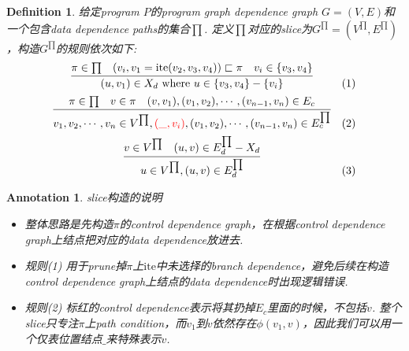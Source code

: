 \documentclass{article}
\newtheorem{definition}[theorem]{Definition}
\newtheorem{annotation}[theorem]{Annotation}
\begin{document}
\begin{definition}
\rm 给定program $P$的program graph dependence graph $G=(V,E)$和一个包含data dependence paths的集合$\prod$. 定义$\prod$对应的slice为$G^{\prod} = (V^{\prod},E^{\prod})$，构造$G^{\prod}$的规则依次如下:
$$
\begin{array}{cl}
\infer{(u,v_1) \in X_d~\text{where}~u \in \{v_3,v_4\}-\{v_i\}}{\pi \in \prod & (v_i,v_1=\text{ite}(v_2,v_3,v_4)) \sqsubset \pi & v_i \in \{v_3,v_4\}} & (1) \\[0.5em]
\infer{v_1,v_2,\cdots,v_n \in V^{\prod}, {\color{red}(\_,v_i)},(v_1,v_2),\cdots,(v_{n-1},v_n) \in E_c^{\prod}}{\pi \in \prod & v \in \pi & (v,v_1),(v_1,v_2),\cdots,(v_{n-1},v_n) \in E_c} & (2) \\[0.5em]
\infer{u \in V^{\prod}, (u,v) \in E_d^{\prod}}{v \in V^{\prod} & (u,v) \in E_d^{\prod}-X_d} & (3)
\end{array}
$$
\end{definition}

\begin{annotation}
\rm slice构造的说明
\begin{itemize}
	\item 整体思路是先构造$\pi$的control dependence graph，在根据control dependence graph上结点把对应的data dependence放进去. 
	\item 规则(1) 用于prune掉$\pi$上$\text{ite}$中未选择的branch  dependence，避免后续在构造control dependence graph上结点的data dependence时出现逻辑错误.
	\item 规则(2) 标红的control dependence表示将其扔掉$E_c$里面的时候，不包括$v$. 整个slice只专注$\pi$上path condition，而$v_1$到$v$依然存在$\phi(v_1,v)$，因此我们可以用一个仅表位置结点$\_$来特殊表示$v$.  
\end{itemize}
\end{annotation}
\end{document}
